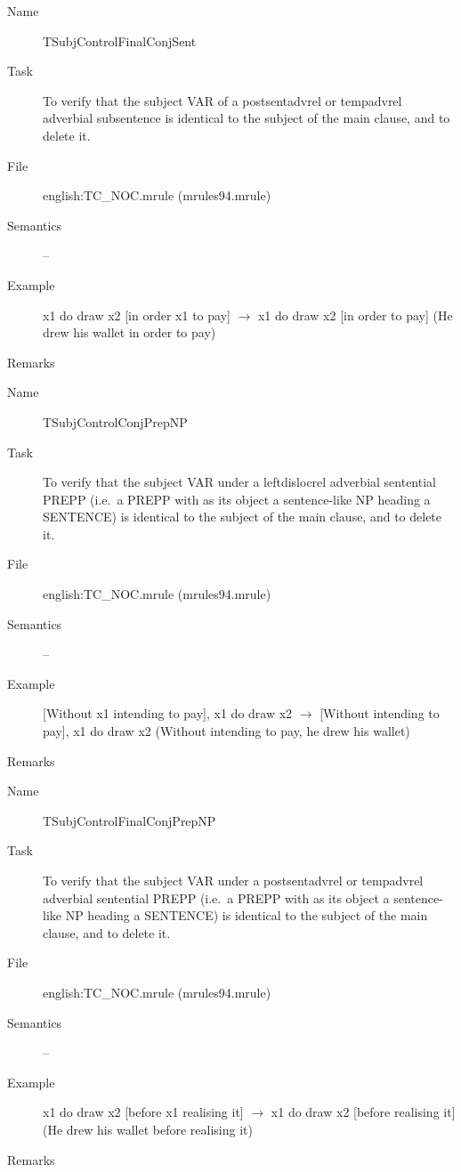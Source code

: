 \begin{description}
\vspace{1 cm}
\begin{description}
\item[Name] TSubjControlFinalConjSent
\item[Task] To verify that the subject VAR of a postsentadvrel or tempadvrel 
adverbial subsentence 
is identical to the subject of the main clause, and to delete it.
\item[File] english:TC\_NOC.mrule (mrules94.mrule)
\item[Semantics] --
\item[Example] x1 do draw x2 [in order x1 to pay] $\rightarrow$ x1 do draw x2 
[in order to pay] (He drew his wallet in order to pay)
\item[Remarks] 
\end{description}

\vspace{1 cm}
\begin{description}
\item[Name]   TSubjControlConjPrepNP
\item[Task] To verify that the subject VAR under a leftdislocrel adverbial 
sentential 
PREPP (i.e.\ a PREPP with as its object a sentence-like NP heading a SENTENCE)
is identical to the subject of the main clause, and to delete it.
\item[File] english:TC\_NOC.mrule (mrules94.mrule)
\item[Semantics] --
\item[Example] [Without x1 intending to pay], x1 do draw x2 $\rightarrow$ 
[Without intending to pay], x1 do draw x2 (Without intending to pay, he drew 
his wallet)
\item[Remarks] 
\end{description}

\vspace{1 cm}
\begin{description}
\item[Name] TSubjControlFinalConjPrepNP
\item[Task] To verify that the subject VAR under a postsentadvrel or tempadvrel 
adverbial sentential 
PREPP (i.e.\ a PREPP with as its object a sentence-like NP heading a SENTENCE)
is identical to the subject of the main clause, and to delete it.
\item[File] english:TC\_NOC.mrule (mrules94.mrule)
\item[Semantics] --
\item[Example] x1 do draw x2 [before x1 realising it] $\rightarrow$ 
x1 do draw x2 [before realising it] (He drew his wallet before realising it)
\item[Remarks] 
\end{description}


\end{description}
